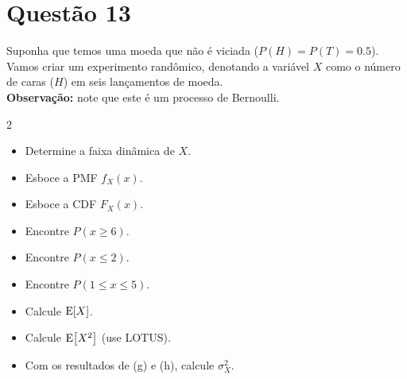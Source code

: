 \section{Questão 13}

Suponha que temos uma moeda que não é viciada ($P(H) = P(T) = 0.5$).
Vamos criar um experimento randômico, denotando a variável $X$ como o número de caras ($H$) 
em seis lançamentos de moeda. \\

\textbf{\sffamily \color{vermelhoescuro} Observação:} note que este é um processo de Bernoulli.

\begin{multicols}{2}
\begin{itemize}
    \item [a)] Determine a faixa dinâmica de $X$.
    \item [b)] Esboce a PMF $f_X(x)$.
    \item [c)] Esboce a CDF $F_X(x)$.
    \item [d)] Encontre $P(x \geq 6)$.
    \item [e)] Encontre $P(x \leq 2)$.
    \item [f)] Encontre $P(1 \leq x \leq 5)$.
    \item [g)] Calcule $\mathrm{E}\!\left[X\right]$.
    \item [h)] Calcule $\mathrm{E}\!\left[X^2\right]$ (use LOTUS).
    \item [i)] Com os resultados de (g) e (h), calcule $\sigma_X^2$.
\end{itemize}
\end{multicols}

\respostas

